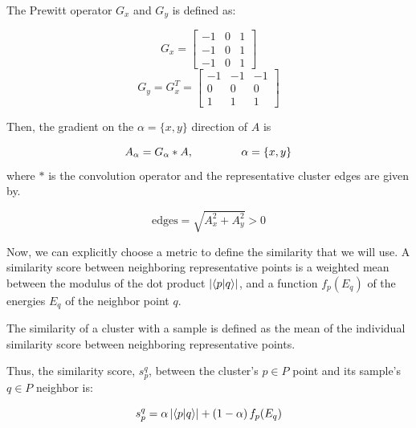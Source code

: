 \documentclass[a4paper,12pt]{report}
\begin{document}
\begin{appendices}
The Prewitt operator $G_x$ and $G_y$ is defined as:

\begin{multicols}{2}
    \begin{equation}
        G_x = \left[
            \begin{array}{ccc}
                -1 & 0 & 1 \\
                -1 & 0 & 1 \\
                -1 & 0 & 1
            \end{array}
            \right]
    \end{equation}
    \begin{equation}
        G_y = G_x^T=\left[
            \begin{array}{ccc}
                -1 & -1 & -1 \\
                0  & 0  & 0  \\
                1  & 1  & 1
            \end{array}
            \right]
    \end{equation}
\end{multicols}

Then, the gradient on the $\alpha=\{x,y\}$ direction of $A$ is

\begin{equation}
    A_\alpha = G_\alpha \ast A,\hspace{1.5cm}\alpha=\{x,y\}
\end{equation}
where $\ast$ is the convolution operator and the representative cluster edges are given by.

\begin{equation}
    \text{edges} = \sqrt{A_x^2+A_y^2} > 0
\end{equation}

Now, we can explicitly choose a metric to define the similarity that we will use.
A similarity score between neighboring representative points is a weighted mean between the modulus of the dot product $\left|\braket{p}{q}\right|$, and a function $f_p(E_q)$ of the energies $E_q$ of the neighbor point $q$.

The similarity of a cluster with a sample is defined as the mean of the individual similarity score between neighboring representative points.

Thus, the similarity score, $s_p^q$, between the cluster's $p\in P$ point and its sample's $q \in P$ neighbor is:

\begin{equation}
    s_p^q = \alpha\left|\braket{p}{q}\right| + \left(1-\alpha\right)f_p(E_q)
\end{equation}


\end{appendices}
\end{document}
